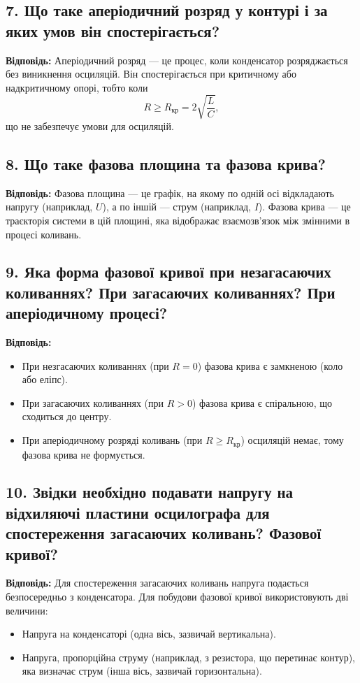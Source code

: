 \documentclass[12pt,a4paper]{article}
\begin{document}
    \subsection*{7. Що таке аперіодичний розряд у контурі і за яких умов він спостерігається?}
    \textbf{Відповідь:}  
    Аперіодичний розряд --- це процес, коли конденсатор розряджається без виникнення осциляцій.  
    Він спостерігається при критичному або надкритичному опорі, тобто коли
    \[
    R \ge R_{\text{кр}} = 2\sqrt{\frac{L}{C}},
    \]
    що не забезпечує умови для осциляцій.

    \subsection*{8. Що таке фазова площина та фазова крива?}
    \textbf{Відповідь:}  
    Фазова площина --- це графік, на якому по одній осі відкладають напругу (наприклад, \(U\)), а по іншій --- струм (наприклад, \(I\)).  
    Фазова крива --- це траєкторія системи в цій площині, яка відображає взаємозв’язок між змінними в процесі коливань.

    \subsection*{9. Яка форма фазової кривої при незагасаючих коливаннях? При загасаючих коливаннях? При аперіодичному процесі?}
    \textbf{Відповідь:}  
    \begin{itemize}
        \item При незгасаючих коливаннях (при \(R=0\)) фазова крива є замкненою (коло або еліпс).
        \item При загасаючих коливаннях (при \(R>0\)) фазова крива є спіральною, що сходиться до центру.
        \item При аперіодичному розряді коливань (при \(R \ge R_{\text{кр}}\)) осциляцій немає, тому фазова крива не формується.
    \end{itemize}

    \subsection*{10. Звідки необхідно подавати напругу на відхиляючі пластини осцилографа для спостереження загасаючих коливань? Фазової кривої?}
    \textbf{Відповідь:}  
    Для спостереження загасаючих коливань напруга подається безпосередньо з конденсатора.  
    Для побудови фазової кривої використовують дві величини:  
    \begin{itemize}
        \item Напруга на конденсаторі (одна вісь, зазвичай вертикальна).
        \item Напруга, пропорційна струму (наприклад, з резистора, що перетинає контур), яка визначає струм (інша вісь, зазвичай горизонтальна).
    \end{itemize}
\end{document}
